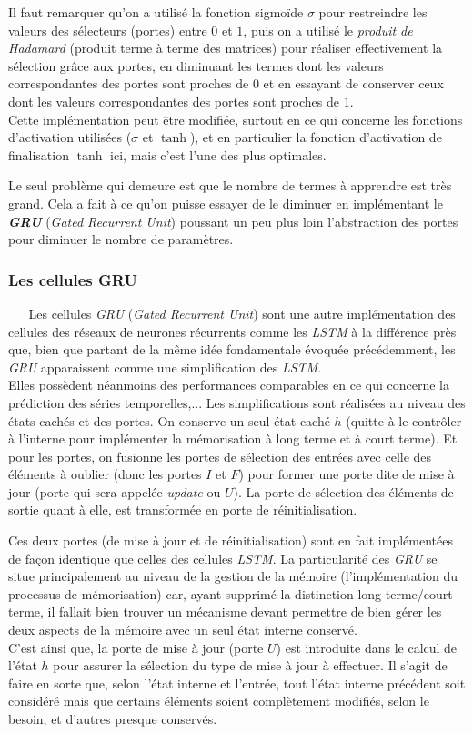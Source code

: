 Il faut remarquer qu'on a utilisé la fonction sigmoïde $ \sigma $ pour restreindre les valeurs des sélecteurs (portes) entre $ 0 $ et $ 1 $, puis on a utilisé le \textit{produit de Hadamard} (produit terme à terme des matrices) pour réaliser effectivement la sélection grâce aux portes, en diminuant les termes dont les valeurs correspondantes des portes sont proches de $ 0 $ et en essayant de conserver ceux dont les valeurs correspondantes des portes sont proches de $ 1 $.\\
Cette implémentation peut être modifiée, surtout en ce qui concerne les fonctions d'ac\-ti\-va\-tion utilisées ($ \sigma $ et $ \tanh $), et en particulier la fonction d'activation de finalisation $ \tanh $ ici, mais c'est l'une des plus optimales.

Le seul problème qui demeure est que le nombre de termes à apprendre est très grand. Cela a fait à ce qu'on puisse essayer de le diminuer en implémentant le \textit{\textbf{GRU}} (\textit{Gated Recurrent Unit}) poussant un peu plus loin l'abstraction des portes pour diminuer le nombre de paramètres.
\subsubsection{Les cellules GRU}
$ _{} $ $ _{} $ $ _{} $ $ _{} $ $ _{} $Les cellules \textit{GRU} (\textit{Gated Recurrent Unit}) sont une autre implémentation des cellules des réseaux de neurones récurrents comme les \textit{LSTM} à la différence près que, bien que partant de la même idée fondamentale évoquée précédemment, les \textit{GRU} apparaissent comme une simplification des \textit{LSTM}.\\
Elles possèdent néanmoins des performances comparables en ce qui concerne la prédiction des séries temporelles,... Les simplifications sont réalisées au niveau des états cachés et des portes. On conserve un seul état caché $ h $ (quitte à le contrôler à l'interne pour implémenter la mémorisation à long terme et à court terme). Et pour les portes, on fusionne les portes de sélection des entrées avec celle des éléments à oublier (donc les portes $ I $ et $ F $) pour former une porte dite de mise à jour (porte qui sera appelée \textit{update} ou $ U $). La porte de sélection des éléments de sortie quant à elle, est transformée en porte de réinitialisation.

Ces deux portes (de mise à jour et de réinitialisation) sont en fait implémentées de façon identique que celles des cellules \textit{LSTM}. La particularité des \textit{GRU} se situe prin\-ci\-pa\-le\-ment au niveau de la gestion de la mémoire (l'implémentation du processus de mémorisation) car, ayant supprimé la distinction long-terme/court-terme, il fallait bien trouver un mé\-ca\-ni\-sme devant permettre de bien gérer les deux aspects de la mémoire avec un seul état interne conservé.\\
C'est ainsi que, la porte de mise à jour (porte $ U $) est introduite dans le calcul de l'état $ h $ pour assurer la sélection du type de mise à jour à effectuer. Il s'agit de faire en sorte que, selon l'état interne et l'entrée, tout l'état interne précédent soit considéré  mais que certains éléments soient complètement modifiés, selon le besoin, et d'autres presque conservés.


